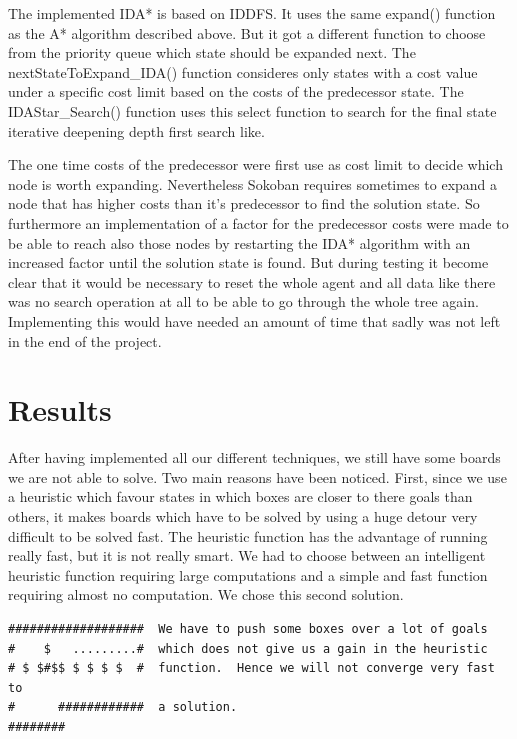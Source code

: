 \documentclass[a4paper,10pt]{article}
\begin{document}
	The implemented IDA* is based on IDDFS. It uses the same expand() function as the A* algorithm described above. But it got a different function to choose from the priority queue which state should be expanded next. The nextStateToExpand_IDA() function consideres only states with a cost value under a specific cost limit based on the costs of the predecessor state. The IDAStar_Search() function uses this select function to search for the final state iterative deepening depth first search like.

	The one time costs of the predecessor were first use as cost limit to decide which node is worth expanding. Nevertheless Sokoban requires sometimes to expand a node that has higher costs than it's predecessor to find the solution state. 
	So furthermore an implementation of a factor for the predecessor costs were made to be able to reach also those nodes by restarting the IDA* algorithm with an increased factor until the solution state is found. But during testing it become clear that it would be necessary to reset the whole agent and all data like there was no search operation at all to be able to go through the whole tree again. Implementing this would have needed an amount of time that sadly was not left in the end of the project.

        \cite{solving_soko}


\section{Results}
After having implemented all our different techniques, we still have some boards we are not able to solve. Two main reasons have been noticed. First, since we use a heuristic which favour states in which boxes are closer to there goals than others, it makes boards which have to be solved by using a huge detour very difficult to be solved fast. The heuristic function has the advantage of running really fast, but it is not really smart. 
We had to choose between an intelligent heuristic function requiring large computations and a simple and fast function requiring almost no computation. We chose this second solution.
\begin{verbatim}
###################  We have to push some boxes over a lot of goals
#    $   .........#  which does not give us a gain in the heuristic
# $ $#$$ $ $ $ $  #  function.  Hence we will not converge very fast to
#      ############  a solution.
########
\end{verbatim}
\end{document}
